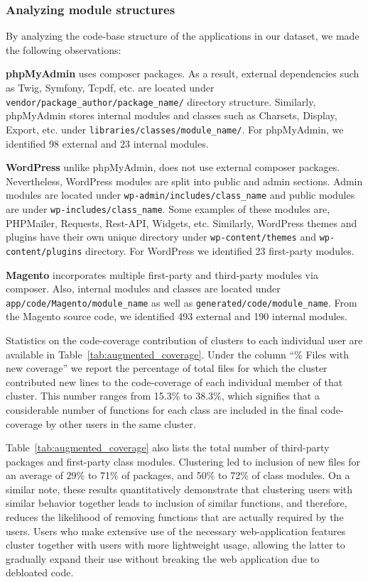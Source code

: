 \subsubsection{Analyzing module structures} By analyzing the code-base structure of the applications in our dataset, we made the following observations:

\textbf{phpMyAdmin} uses composer packages. As a result, external dependencies such as Twig, Symfony, Tcpdf, etc. are located under \texttt{vendor/package\_author/package\_name/} directory structure.
Similarly, phpMyAdmin stores internal modules and classes such as Charsets, Display, Export, etc. under \texttt{libraries/classes/module\_name/}. 
For phpMyAdmin, we identified 98 external and 23 internal modules.

\textbf{WordPress} unlike phpMyAdmin, does not use external composer packages. 
Nevertheless, WordPress modules are split into public and admin sections. 
Admin modules are located under \texttt{wp-admin/includes/class\_name} and public modules are under \texttt{wp-includes/class\_name}. 
Some examples of these modules are, PHPMailer, Requests, Rest-API, Widgets, etc.
Similarly, WordPress themes and plugins have their own unique directory under \texttt{wp-content/themes} and \texttt{wp-content/plugins} directory. 
For WordPress we identified 23 first-party modules. 

\textbf{Magento} incorporates multiple first-party and third-party modules via composer. 
Also, internal modules and classes are located under \texttt{app/code/Magento/module\_name} as well as \texttt{generated/code/module\_name}. 
From the Magento source code, we identified 493 external and 190 internal modules. 

Statistics on the code-coverage contribution of clusters to each individual user are available in Table~\ref{tab:augmented_coverage}. 
Under the column ``\% Files with new coverage'' we report the percentage of total files for which the cluster contributed new lines to the code-coverage of each individual member of that cluster. 
This number ranges from 15.3\% to 38.3\%, which signifies that a considerable number of functions for each class are included in the final code-coverage by other users in the same cluster. 

Table~\ref{tab:augmented_coverage} also lists the total number of third-party packages and first-party class modules. 
Clustering led to inclusion of new files for an average of 29\% to 71\% of packages, and 50\% to 72\% of class modules. 
On a similar note, these results quantitatively demonstrate that clustering users with similar behavior together leads to inclusion of similar functions, and therefore, reduces the likelihood of removing functions that are actually required by the users. 
Users who make extensive use of the necessary web-application features cluster together with users with more lightweight usage, allowing the latter to gradually expand their use without breaking the web application due to debloated code. 

